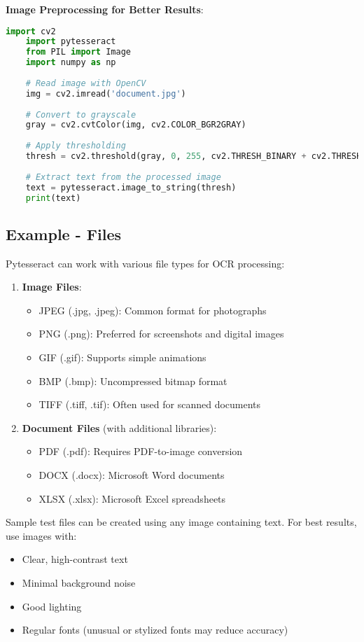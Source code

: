 \textbf{Image Preprocessing for Better Results}:
\begin{lstlisting}[language=Python]
	import cv2
	import pytesseract
	from PIL import Image
	import numpy as np
	
	# Read image with OpenCV
	img = cv2.imread('document.jpg')
	
	# Convert to grayscale
	gray = cv2.cvtColor(img, cv2.COLOR_BGR2GRAY)
	
	# Apply thresholding
	thresh = cv2.threshold(gray, 0, 255, cv2.THRESH_BINARY + cv2.THRESH_OTSU)[1]
	
	# Extract text from the processed image
	text = pytesseract.image_to_string(thresh)
	print(text)
\end{lstlisting}

\subsection{Example - Files}
Pytesseract can work with various file types for OCR processing:

\begin{enumerate}
	\item \textbf{Image Files}:
	\begin{itemize}
		\item JPEG (.jpg, .jpeg): Common format for photographs
		\item PNG (.png): Preferred for screenshots and digital images
		\item GIF (.gif): Supports simple animations
		\item BMP (.bmp): Uncompressed bitmap format
		\item TIFF (.tiff, .tif): Often used for scanned documents
	\end{itemize}
	
	\item \textbf{Document Files} (with additional libraries):
	\begin{itemize}
		\item PDF (.pdf): Requires PDF-to-image conversion
		\item DOCX (.docx): Microsoft Word documents
		\item XLSX (.xlsx): Microsoft Excel spreadsheets
	\end{itemize}
\end{enumerate}

Sample test files can be created using any image containing text. For best results, use images with:
\begin{itemize}
	\item Clear, high-contrast text
	\item Minimal background noise
	\item Good lighting
	\item Regular fonts (unusual or stylized fonts may reduce accuracy) \cite {Betterpath:2023, GeekyAnts:2023}
\end{itemize}

